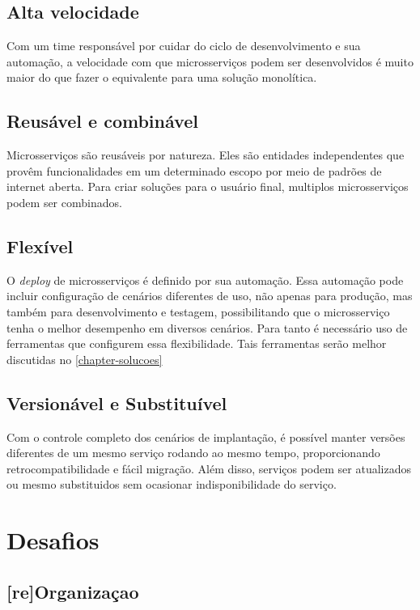 \subsection{Alta velocidade}

Com um time responsável por cuidar do ciclo de desenvolvimento e sua automação, a velocidade com que microsserviços podem ser desenvolvidos é muito maior do que fazer o equivalente para uma solução monolítica. \cite{Familiar2015}

\subsection{Reusável e combinável}

Microsserviços são reusáveis por natureza. Eles são entidades independentes que provêm funcionalidades em um determinado escopo por meio de padrões de internet aberta. Para criar soluções para o usuário final, multiplos microsserviços podem ser combinados. \cite{Familiar2015}

\subsection{Flexível}

O \emph{deploy} de microsserviços é definido por sua automação. Essa automação pode incluir configuração de cenários diferentes de uso, não apenas para produção, mas também para desenvolvimento e testagem, possibilitando que o microsserviço tenha o melhor desempenho em diversos cenários. Para tanto é necessário uso de ferramentas que configurem essa flexibilidade. Tais ferramentas serão melhor discutidas no \autoref{chapter-solucoes} \cite{Familiar2015}

\subsection{Versionável e Substituível}

Com o controle completo dos cenários de implantação, é possível manter versões diferentes de um mesmo serviço rodando ao mesmo tempo, proporcionando retrocompatibilidade e fácil migração. Além disso, serviços podem ser atualizados ou mesmo substituidos sem ocasionar indisponibilidade do serviço. \cite{Familiar2015}

\section{Desafios}

\subsection{[re]Organizaçao}

